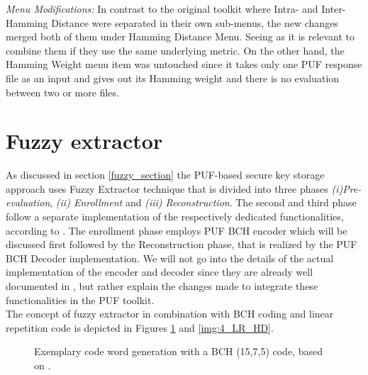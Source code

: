 \emph{Menu Modifications:} In contrast to the original toolkit where Intra- and Inter-Hamming Distance were separated in their own sub-menus, the new changes merged both of them under Hamming Distance Menu. Seeing as it is relevant to combine them if they use the same underlying metric. On the other hand, the Hamming Weight menu item was untouched since it takes only one PUF response file as an input and gives out its Hamming weight and there is no evaluation between two or
more files.\\


\section{Fuzzy extractor}
As discussed in section \ref{fuzzy_section} the PUF-based secure key storage approach uses Fuzzy Extractor technique that is divided into three phases \emph{(i)Pre-evaluation}, \emph{(ii) Enrollment} and \emph{(iii) Reconstruction}. The second and third phase follow a separate implementation of the respectively dedicated functionalities, according to \cite{10}.  The enrollment phase employs PUF BCH encoder which will be discussed first followed by the Reconstruction phase, that is realized by the PUF BCH Decoder implementation.
We will not go into the details of the actual implementation of the encoder and decoder since they are already well documented in \cite{71}, but rather explain the changes made to integrate these functionalities in the PUF toolkit.\\

The concept of fuzzy extractor in combination with BCH coding and linear repetition code is depicted in Figures \ref{img:4_BCH_concept} and \ref{img:4_LR_HD}.\\

\begin{figure}[h]
\centering
{}
\caption{Exemplary code word generation with a BCH (15,7,5) code, based on \cite{10}.}
\label{img:4_BCH_concept}
\end{figure}

